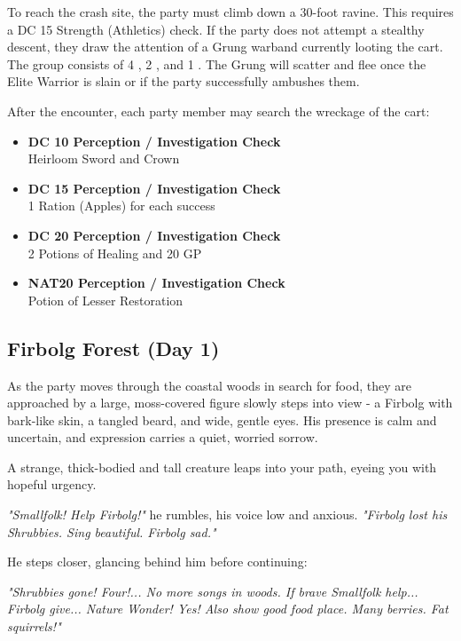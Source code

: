 {\noindent\entryfont To reach the crash site, the party must climb down a 30-foot ravine. This requires a DC 15 Strength (Athletics) check. If the party does not attempt a stealthy descent, they draw the attention of a Grung warband currently looting the cart. The group consists of 4 \hyperref[monster:Grung]{}, 2 \hyperref[monster:GrungWildling]{}, and 1 \hyperref[monster:GrungEliteWarrior]{}. The Grung will scatter and flee once the Elite Warrior is slain or if the party successfully ambushes them.

After the encounter, each party member may search the wreckage of the cart:
\begin{itemize}
	\renewcommand\labelitemi{\textbf{\textbullet}}
	\item \textbf{DC 10 Perception / Investigation Check}\\Heirloom Sword and Crown
	\item \textbf{DC 15 Perception / Investigation Check}\\1 Ration (Apples) for each success
	\item \textbf{DC 20 Perception / Investigation Check}\\2 Potions of Healing and 20 GP
	\item \textbf{NAT20 Perception / Investigation Check}\\Potion of Lesser Restoration
\end{itemize}}

\subsection*{Firbolg Forest (Day 1)}
{\entryfont As the party moves through the coastal woods in search for food, they are approached by a large, moss-covered figure slowly steps into view - a Firbolg with bark-like skin, a tangled beard, and wide, gentle eyes. His presence is calm and uncertain, and expression carries a quiet, worried sorrow.}

\begin{DndReadAloud}
	A strange, thick-bodied and tall creature leaps into your path, eyeing you with hopeful urgency.

	\textit{"Smallfolk! Help Firbolg!"} he rumbles, his voice low and anxious. \textit{"Firbolg lost his Shrubbies. Sing beautiful. Firbolg sad."}

	He steps closer, glancing behind him before continuing:

	\textit{"Shrubbies gone! Four!... No more songs in woods. If brave Smallfolk help... Firbolg give... Nature Wonder! Yes! Also show good food place. Many berries. Fat squirrels!"}
\end{DndReadAloud}

